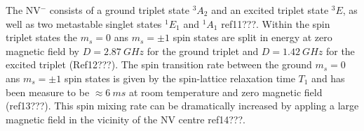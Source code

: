 \documentclass[,prl,twocolumn]{revtex4}
\begin{document}
The NV$^-$ consists of a ground triplet state $^3A_2$ and an excited triplet state $^3E$, as well as two metastable singlet states $^1E_1$ and $^1A_1$ ref11???. Within the spin triplet states the $m_s = 0$ ans $m_s = \pm1$ spin states are split in energy at zero magnetic field by $D=\SI{2.87}{GHz}$ for the ground triplet and $D=\SI{1.42}{GHz}$ for the excited triplet (Ref12???). The spin transition rate between the ground $m_s = 0$ ans $m_s = \pm1$ spin states is given by the spin-lattice relaxation time $T_1$ and has been measure to be $\approx\SI{6}{ms}$ at room temperature and zero magnetic field (ref13???). This spin mixing rate can be dramatically increased by appling a large magnetic field in the vicinity of the NV centre ref14???.

 
\end{document}
